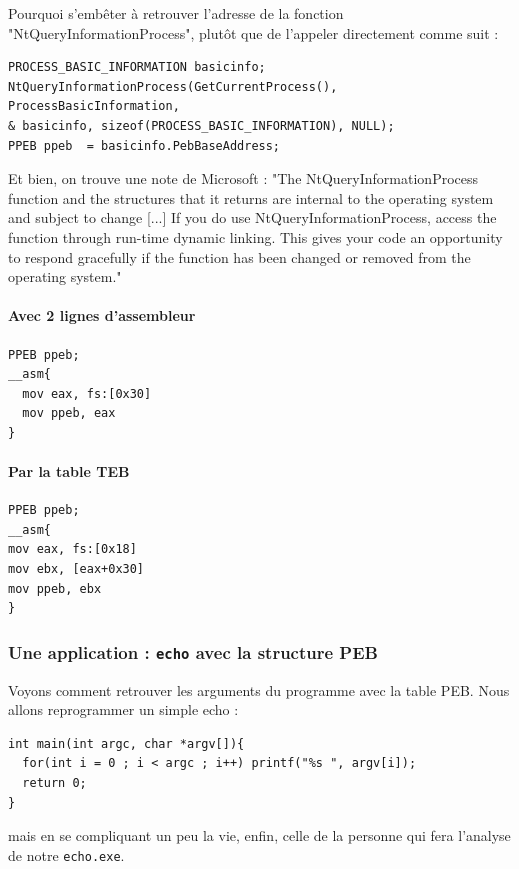 \documentclass{book}
\newcommand{\code}[1]{\texttt{#1}}
\begin{document}
Pourquoi s'embêter à retrouver l'adresse de la fonction "NtQueryInformationProcess", plutôt que de l'appeler directement comme suit : 

\begin{verbatim}
PROCESS_BASIC_INFORMATION basicinfo;
NtQueryInformationProcess(GetCurrentProcess(), ProcessBasicInformation, 
& basicinfo, sizeof(PROCESS_BASIC_INFORMATION), NULL);
PPEB ppeb  = basicinfo.PebBaseAddress;
\end{verbatim}

Et bien, on trouve une note de Microsoft :  "The NtQueryInformationProcess function and the structures that it returns are internal to the operating system and subject to change [...] If you do use NtQueryInformationProcess, access the function through run-time dynamic linking. This gives your code an opportunity to respond gracefully if the function has been changed or removed from the operating system." 




\paragraph{Avec 2 lignes d'assembleur}

\begin{verbatim}
PPEB ppeb;
__asm{
  mov eax, fs:[0x30]
  mov ppeb, eax
}
\end{verbatim}

\paragraph{Par la table TEB}

\begin{verbatim}
PPEB ppeb;
__asm{
mov eax, fs:[0x18]
mov ebx, [eax+0x30]
mov ppeb, ebx
}
\end{verbatim}



\subsubsection{Une application : {\tt echo} avec la structure PEB}

Voyons comment retrouver les arguments du programme avec la table PEB. Nous allons reprogrammer un simple echo : 

\begin{verbatim}
int main(int argc, char *argv[]){
  for(int i = 0 ; i < argc ; i++) printf("%s ", argv[i]);
  return 0;
}
\end{verbatim}
mais en se compliquant un peu la vie, enfin, celle de la personne qui fera l'analyse de notre \code{echo.exe}.  
\end{document}
